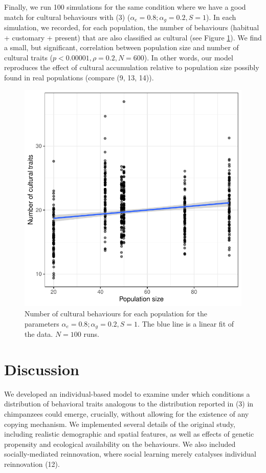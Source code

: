 \documentclass[9pt,twocolumn,twoside,]{pnas-new}
\begin{document}
Finally, we run 100 simulations for the same condition where we have a
good match for cultural behaviours with (3)
(\(\alpha_e=0.8;\alpha_g=0.2, S=1\)). In each simulation, we recorded,
for each population, the number of behaviours (habitual + customary +
present) that are also classified as cultural (see Figure
\ref{Figure4}). We find a small, but significant, correlation between
population size and number of cultural traits
(\(p<0.00001,\rho=0.2,N=600\)). In other words, our model reproduces the
effect of cultural accumulation relative to population size possibly
found in real populations (compare (9, 13, 14)).

\begin{figure}[h!]
\begin{center}
\includegraphics[width=11.4cm]{figures/figure_4.pdf}
\caption{Number of cultural behaviours for each population for the parameters $\alpha_e=0.8;\alpha_g=0.2,S=1$. The blue line is a linear fit of the data. $N=100$ runs.}
\label{Figure4}
\end{center}
\end{figure}

\section*{Discussion}\label{discussion}

We developed an individual-based model to examine under which conditions
a distribution of behavioral traits analogous to the distribution
reported in (3) in chimpanzees could emerge, crucially, without allowing
for the existence of any copying mechanism. We implemented several
details of the original study, including realistic demographic and
spatial features, as well as effects of genetic propensity and
ecological availability on the behaviours. We also included
socially-mediated reinnovation, where social learning merely catalyses
individual reinnovation (12).
\end{document}
